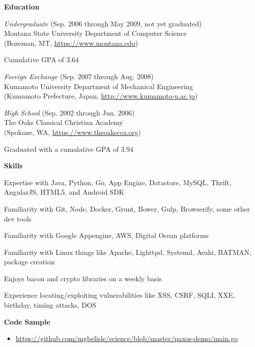 \documentclass[10pt, a4paper]{article}
\begin{document}
\textbf{Education}
\begin{itemize*}
  \item \emph{Undergraduate} (Sep. 2006 through May 2009, not yet graduated)\\
    Montana State University Department of Computer Science\\
    (Bozeman, MT, \url{https://www.montana.edu})
    \begin{itemize*}
      \item Cumulative GPA of 3.64
    \end{itemize*}
  \item \emph{Foreign Exchange} (Sep. 2007 through Aug. 2008)\\
    Kumamoto University Department of Mechanical Engineering\\
    (Kumamoto Prefecture, Japan, \url{http://www.kumamoto-u.ac.jp})
  \item \emph{High School} (Sep. 2002 through Jun. 2006)\\
    The Oaks Classical Christian Academy\\
    (Spokane, WA, \url{https://www.theoakscca.org})
    \begin{itemize*}
      \item Graduated with a cumulative GPA of 3.94
    \end{itemize*}
\end{itemize*}
\textbf{Skills}
\begin{itemize*}
  \item Expertise with Java, Python, Go, App Engine, Datastore, MySQL, Thrift, AngularJS, HTML5, and Android SDK
  \item Familiarity with Git, Node, Docker, Grunt, Bower, Gulp, Browserify, some other dev tools
  \item Familiarity with Google Appengine, AWS, Digital Ocean platforms
  \item Familiarity with Linux things like Apache, Lighttpd, Systemd, Avahi, BATMAN, package creation
  \item Enjoys bacon and crypto libraries on a weekly basis
  \item Experience locating/exploiting vulnerabilities like XSS, CSRF, SQLI, XXE, birthday, timing attacks, DOS
\end{itemize*}
\textbf{Code Sample}
\begin{itemize}
  \item[] \url{https://github.com/mgbelisle/science/blob/master/paxos-demo/main.go}
\end{itemize}
\end{document}
